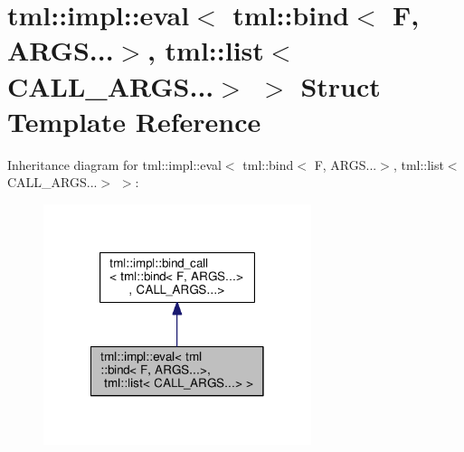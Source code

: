 \hypertarget{structtml_1_1impl_1_1eval_3_01tml_1_1bind_3_01_f_00_01_a_r_g_s_8_8_8_4_00_01tml_1_1list_3_01_c_a_l_l___a_r_g_s_8_8_8_4_01_4}{\section{tml\+:\+:impl\+:\+:eval$<$ tml\+:\+:bind$<$ F, A\+R\+G\+S...$>$, tml\+:\+:list$<$ C\+A\+L\+L\+\_\+\+A\+R\+G\+S...$>$ $>$ Struct Template Reference}
\label{structtml_1_1impl_1_1eval_3_01tml_1_1bind_3_01_f_00_01_a_r_g_s_8_8_8_4_00_01tml_1_1list_3_01_c_a_l_l___a_r_g_s_8_8_8_4_01_4}
}


Inheritance diagram for tml\+:\+:impl\+:\+:eval$<$ tml\+:\+:bind$<$ F, A\+R\+G\+S...$>$, tml\+:\+:list$<$ C\+A\+L\+L\+\_\+\+A\+R\+G\+S...$>$ $>$\+:
\nopagebreak
\begin{figure}[H]
\begin{center}
\leavevmode
\includegraphics[width=222pt]{structtml_1_1impl_1_1eval_3_01tml_1_1bind_3_01_f_00_01_a_r_g_s_8_8_8_4_00_01tml_1_1list_3_01_c_aea6fad208a08c0cb7b0f8e0b48c5e9f1}
\end{center}
\end{figure}


